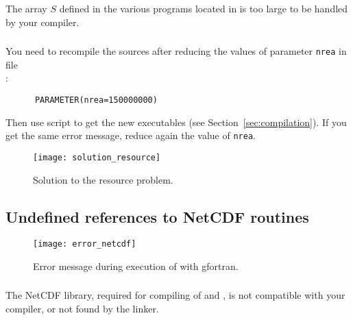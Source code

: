The array $S$ defined in the various programs located in  is too large to be handled by your compiler. 


\subsubsection{\answer}

You need to recompile the sources after reducing the values of parameter \texttt{nrea} in file\\
 :
\begin{verbatim}
      PARAMETER(nrea=150000000)
\end{verbatim}
Then use script  to get the new executables (see Section~\ref{sec:compilation}). If you get the same error message, reduce again the value of \texttt{nrea}.

\begin{figure}[htpb]
\centering
\texttt{[image: solution\_resource]}
\caption{Solution to the resource problem.}
\end{figure}


\subsection{Undefined references to NetCDF routines\label{sec:error_netcdf}}

\begin{figure}[htpb]
\centering
\texttt{[image: error\_netcdf]}
\caption{Error message during execution of  with gfortran\label{fig:error_netcdf}.}
\end{figure}

\subsubsection{\question}

The NetCDF library, required for compiling of  and , is not compatible with your compiler, or not found by the linker.

\subsubsection{\answer}

